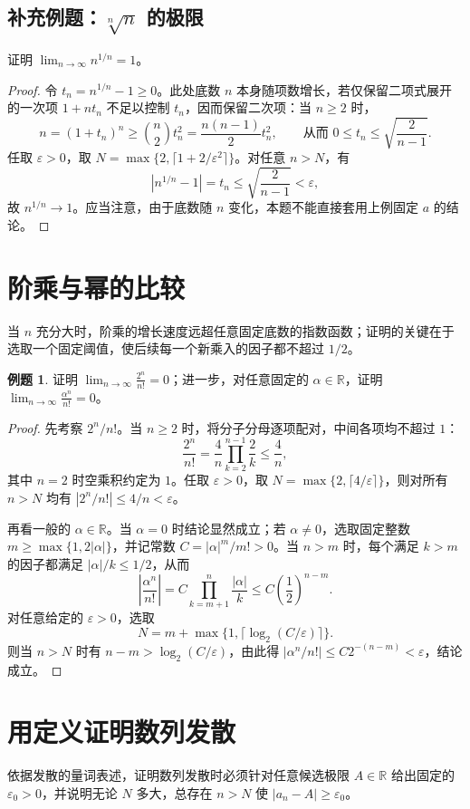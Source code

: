 \documentclass[UTF8, fontset=fandol, a4paper, 12pt]{ctexart}
\newcommand{\R}{\mathbb R}
\theoremstyle{definition}
\newtheorem{example}{例题}
\begin{document}
\subsection*{补充例题：$\sqrt[n]{n}$ 的极限}
证明 $\displaystyle\lim_{n\to\infty}n^{1/n}=1$。
\begin{proof}
令 $t_n=n^{1/n}-1\ge0$。此处底数 $n$ 本身随项数增长，若仅保留二项式展开的一次项 $1+nt_n$ 不足以控制 $t_n$，因而保留二次项：当 $n\ge2$ 时，
\[
 n=(1+t_n)^n\ge\binom n2 t_n^2=\frac{n(n-1)}{2}t_n^2,
 \qquad \text{从而 } 0\le t_n\le\sqrt{\frac2{n-1}}.
\]
任取 $\varepsilon>0$，取 $N=\max\{2,\lceil1+2/\varepsilon^2\rceil\}$。对任意 $n>N$，有
\[
 |n^{1/n}-1|=t_n\le\sqrt{\frac2{n-1}}<\varepsilon,
\]
故 $n^{1/n}\to1$。应当注意，由于底数随 $n$ 变化，本题不能直接套用上例固定 $a$ 的结论。
\end{proof}

\section{阶乘与幂的比较}
当 $n$ 充分大时，阶乘的增长速度远超任意固定底数的指数函数；证明的关键在于选取一个固定阈值，使后续每一个新乘入的因子都不超过 $1/2$。

\begin{example}
证明 $\displaystyle\lim_{n\to\infty}\frac{2^n}{n!}=0$；进一步，对任意固定的 $\alpha\in\R$，证明 $\displaystyle\lim_{n\to\infty}\frac{\alpha^n}{n!}=0$。
\end{example}
\begin{proof}
先考察 $2^n/n!$。当 $n\ge2$ 时，将分子分母逐项配对，中间各项均不超过 $1$：
\[
 \frac{2^n}{n!}
 =\frac4n\prod_{k=2}^{n-1}\frac2k\le\frac4n,
\]
其中 $n=2$ 时空乘积约定为 $1$。任取 $\varepsilon>0$，取 $N=\max\{2,\lceil4/\varepsilon\rceil\}$，则对所有 $n>N$ 均有 $|2^n/n!|\le4/n<\varepsilon$。

再看一般的 $\alpha\in\R$。当 $\alpha=0$ 时结论显然成立；若 $\alpha\ne0$，选取固定整数 $m\ge\max\{1,2|\alpha|\}$，并记常数 $C=|\alpha|^m/m!>0$。当 $n>m$ 时，每个满足 $k>m$ 的因子都满足 $|\alpha|/k\le1/2$，从而
\[
 \left|\frac{\alpha^n}{n!}\right|
 =C\prod_{k=m+1}^{n}\frac{|\alpha|}{k}
 \le C\left(\frac12\right)^{n-m}.
\]
对任意给定的 $\varepsilon>0$，选取
\[
 N=m+\max\{1,\lceil\log_2(C/\varepsilon)\rceil\}.
\]
则当 $n>N$ 时有 $n-m>\log_2(C/\varepsilon)$，由此得 $|\alpha^n/n!|\le C2^{-(n-m)}<\varepsilon$，结论成立。
\end{proof}

\section{用定义证明数列发散}
依据发散的量词表述，证明数列发散时必须针对任意候选极限 $A\in\R$ 给出固定的 $\varepsilon_0>0$，并说明无论 $N$ 多大，总存在 $n>N$ 使 $|a_n-A|\ge\varepsilon_0$。
\end{document}
